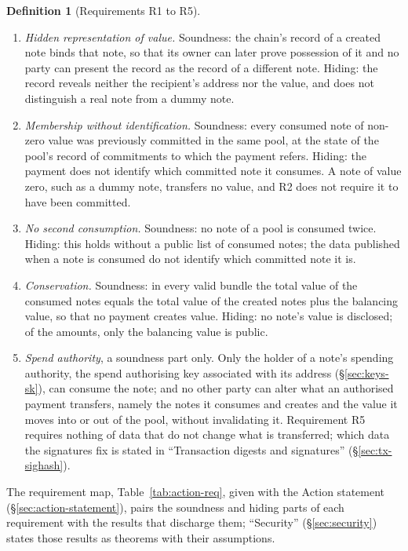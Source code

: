 \documentclass[11pt,a4paper]{article}
\theoremstyle{definition}
\newtheorem{definition}[theorem]{Definition}
\begin{document}
\begin{definition}[Requirements R1 to R5]
\leavevmode
\begin{enumerate}[label=R\arabic*., leftmargin=2.4em]
\item \emph{Hidden representation of value.} Soundness: the chain's record
  of a created note binds that note, so that its owner can later prove
  possession of it and no party can present the record as the record of a
  different note. Hiding: the record reveals neither the recipient's address
  nor the value, and does not distinguish a real note from a dummy note.
\item \emph{Membership without identification.} Soundness: every consumed
  note of non-zero value was previously committed in the same pool, at the
  state of the pool's record of commitments to which the payment refers.
  Hiding: the payment does not identify which committed note it consumes. A
  note of value zero, such as a dummy note, transfers no value, and R2 does
  not require it to have been committed.
\item \emph{No second consumption.} Soundness: no note of a pool is consumed
  twice. Hiding: this holds without a public list of consumed notes; the
  data published when a note is consumed do not identify which committed
  note it is.
\item \emph{Conservation.} Soundness: in every valid bundle the total value
  of the consumed notes equals the total value of the created notes plus the
  balancing value, so that no payment creates value. Hiding: no note's value
  is disclosed; of the amounts, only the balancing value is public.
\item \emph{Spend authority}, a soundness part only. Only the holder of a
  note's spending authority, the spend authorising key associated with its
  address (\S\ref{sec:keys-sk}), can consume the note; and no
  other party can alter what an authorised payment transfers, namely the
  notes it consumes and creates and the value it moves into or out of the
  pool, without invalidating it. Requirement R5 requires nothing of data that
  do not change what is transferred; which data the signatures fix is stated
  in ``Transaction digests and signatures'' (\S\ref{sec:tx-sighash}).
\end{enumerate}
\end{definition}

The requirement map, Table~\ref{tab:action-req}, given with the Action
statement (\S\ref{sec:action-statement}), pairs the soundness and hiding
parts of each requirement with the results that discharge them; ``Security''
(\S\ref{sec:security}) states those results as theorems with their
assumptions.
\end{document}
